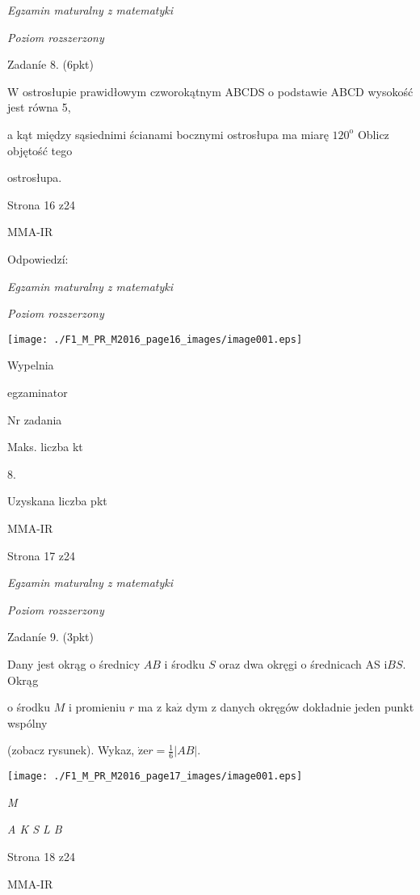 \documentclass[a4paper,12pt]{article}
\begin{document}
{\it Egzamin maturalny z matematyki}

{\it Poziom rozszerzony}

Zadaníe 8. (6pkt)

$\mathrm{W}$ ostrosłupie prawidłowym czworokątnym ABCDS o podstawie ABCD wysokość jest równa 5,

a kąt między sąsiednimi ścianami bocznymi ostrosłupa ma miarę $120^{\mathrm{o}}$ Oblicz objętość tego

ostrosłupa.

Strona 16 z24

MMA-IR





Odpowiedzí:

{\it Egzamin maturalny z matematyki}

{\it Poziom rozszerzony}
\begin{center}
\texttt{[image: ./F1\_M\_PR\_M2016\_page16\_images/image001.eps]}
\end{center}
Wypelnia

egzaminator

Nr zadania

Maks. liczba kt

8.

Uzyskana liczba pkt

MMA-IR

Strona 17 z24





{\it Egzamin maturalny z matematyki}

{\it Poziom rozszerzony}

Zadaníe 9. (3pkt)

Dany jest okrąg o średnicy $AB$ i środku $S$ oraz dwa okręgi o średnicach AS $\mathrm{i}BS$. Okrąg

o środku $M$ i promieniu $r$ ma z $\mathrm{k}\mathrm{a}\dot{\mathrm{z}}$ dym z danych okręgów dokładnie jeden punkt wspólny

(zobacz rysunek). Wykaz, $\displaystyle \dot{\mathrm{z}}\mathrm{e}r=\frac{1}{6}|AB|.$
\begin{center}
\texttt{[image: ./F1\_M\_PR\_M2016\_page17\_images/image001.eps]}
\end{center}
{\it M}

{\it A  K S  L  B}

Strona 18 z24

MMA-IR
\end{document}
